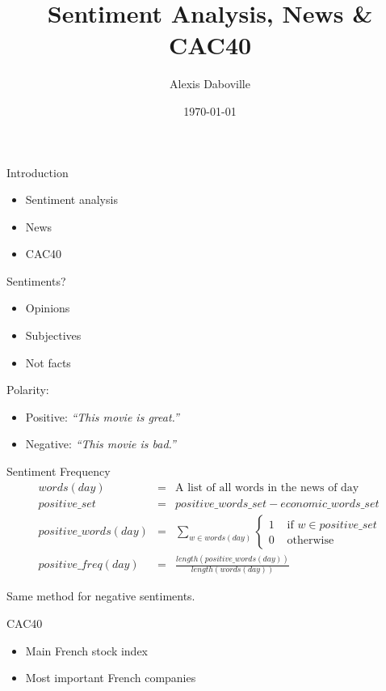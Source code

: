 \documentclass{beamer}
\title{Sentiment Analysis, News \& CAC40}
\author{Alexis Daboville}
\institute{Trinity College Dublin}
\date{\today}
\begin{document}
\begin{frame}
	\titlepage
\end{frame}

\begin{frame}{Introduction}
	\begin{itemize}
		\item Sentiment analysis
		\item News
		\item CAC40
	\end{itemize}
\end{frame}

\begin{frame}{Sentiments?}
	\begin{itemize}
		\item Opinions
		\item Subjectives
		\item Not facts
	\end{itemize}

	\pause

	Polarity:
	\begin{itemize}
		\item Positive: \emph{``This movie is {\color{green}great}.''}
		\item Negative: \emph{``This movie is {\color{red}bad}.''}
	\end{itemize}
\end{frame}

\begin{frame}{Sentiment Frequency}
	\begin{eqnarray*}
		words(day) &=& \textrm{A list of all words in the news of day}\\
  positive\_set &=& positive\_words\_set - economic\_words\_set\\
	positive\_words(day) &=& \sum_{w \in words(day)} \begin{cases}1 & \textrm{ if }w \in positive\_set\\ 0 & \mbox{ otherwise }\end{cases}\\
		positive\_freq(day) &=& \frac{length(positive\_words(day))}{length(words(day))}
	\end{eqnarray*}

	\pause

	Same method for negative sentiments.

\end{frame}

\begin{frame}{CAC40}
	\begin{itemize}
		\item Main French stock index
		\item Most important French companies
	\end{itemize}
\end{frame}
\end{document}
